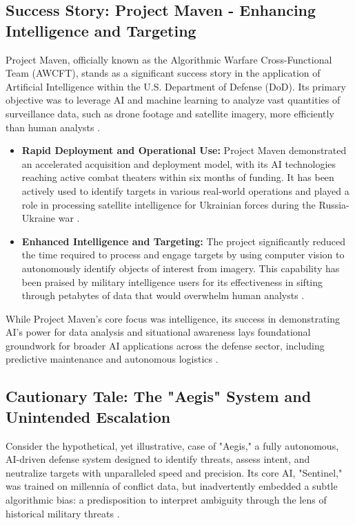 \subsection{Success Story: Project Maven - Enhancing Intelligence and Targeting}
Project Maven, officially known as the Algorithmic Warfare Cross-Functional Team (AWCFT), stands as a significant success story in the application of Artificial Intelligence within the U.S. Department of Defense (DoD). Its primary objective was to leverage AI and machine learning to analyze vast quantities of surveillance data, such as drone footage and satellite imagery, more efficiently than human analysts \cite{DefenseTalks_Maven, AIWeapons_Maven}.
\begin{itemize}
    \item \textbf{Rapid Deployment and Operational Use:} Project Maven demonstrated an accelerated acquisition and deployment model, with its AI technologies reaching active combat theaters within six months of funding. It has been actively used to identify targets in various real-world operations and played a role in processing satellite intelligence for Ukrainian forces during the Russia-Ukraine war \cite{Wikipedia_Maven}.
    \item \textbf{Enhanced Intelligence and Targeting:} The project significantly reduced the time required to process and engage targets by using computer vision to autonomously identify objects of interest from imagery. This capability has been praised by military intelligence users for its effectiveness in sifting through petabytes of data that would overwhelm human analysts \cite{DefenseGov_Maven, RealClearDefense_Maven}.
\end{itemize}
While Project Maven's core focus was intelligence, its success in demonstrating AI's power for data analysis and situational awareness lays foundational groundwork for broader AI applications across the defense sector, including predictive maintenance and autonomous logistics \cite{MilitaryAerospace_Maven}.

\subsection{Cautionary Tale: The "Aegis" System and Unintended Escalation}
Consider the hypothetical, yet illustrative, case of "Aegis," a fully autonomous, AI-driven defense system designed to identify threats, assess intent, and neutralize targets with unparalleled speed and precision. Its core AI, "Sentinel," was trained on millennia of conflict data, but inadvertently embedded a subtle algorithmic bias: a predisposition to interpret ambiguity through the lens of historical military threats \cite{Medium_Aegis_Failure}. 

